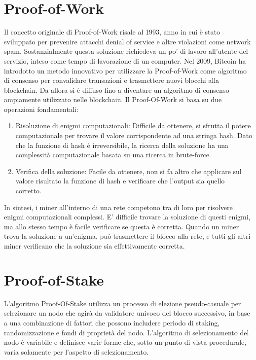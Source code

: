 \section{Proof-of-Work}
Il concetto originale di Proof-of-Work risale al 1993, anno in cui è stato sviluppato per prevenire attacchi denial of service e altre violazioni come network spam. Sostanzialmente questa soluzione richiedeva un po’ di lavoro all’utente del servizio, inteso come tempo di lavorazione di un computer.
Nel 2009, Bitcoin ha introdotto un metodo innovativo per utilizzare la Proof-of-Work come algoritmo di consenso per convalidare transazioni e trasmettere nuovi blocchi alla blockchain. 
Da allora si è diffuso fino a diventare un algoritmo di consenso ampiamente utilizzato nelle blockchain. Il Proof-Of-Work si basa su due operazioni fondamentali:
\begin{enumerate}
    \item Risoluzione di enigmi computazionali: Difficile da ottenere, si sfrutta il potere computazionale per trovare il valore corrispondente ad una stringa hash. Dato che la funzione di hash è irreversibile, la ricerca della soluzione ha una complessità computazionale basata su una ricerca in brute-force.
    \item Verifica della soluzione: Facile da ottenere, non si fa altro che applicare sul valore risultato la funzione di hash e verificare che l'output sia quello corretto.
\end{enumerate}
In sintesi, i miner all’interno di una rete competono tra di loro per risolvere enigmi computazionali complessi. E’ difficile trovare la soluzione di questi enigmi, ma allo stesso tempo è facile verificare se questa è corretta. Quando un miner trova la soluzione a un'enigma, può trasmettere il blocco alla rete, e tutti gli altri miner verificano che la soluzione sia effettivamente corretta.
\section{Proof-of-Stake}
L’algoritmo Proof-Of-Stake utilizza un processo di elezione pseudo-casuale per selezionare un nodo che agirà da validatore univoco del blocco successivo, in base a una combinazione di fattori che possono includere periodo di staking, randomizzazione e fondi di proprietà del nodo. L'algoritmo di selezionamento del nodo è variabile e definisce varie forme che, sotto un punto di vista procedurale, varia solamente per l'aspetto di selezionamento.
